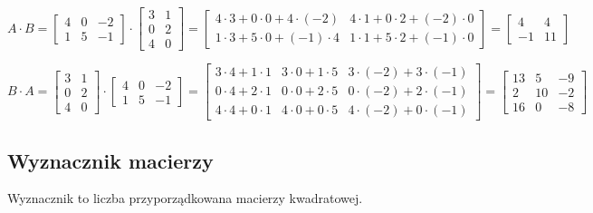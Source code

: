 \documentclass[../Matematyka.tex]{subfiles}
\begin{document}
    \begin{displaymath}
        A \cdot B = 
        \begin{bmatrix}
            4 & 0 & -2 \\
            1 & 5 & -1
        \end{bmatrix}\cdot
        \begin{bmatrix}
            3 & 1 \\
            0 & 2 \\
            4 & 0
        \end{bmatrix} =
        \begin{bmatrix}
            4\cdot3+0\cdot0+4\cdot(-2) & 4\cdot1+0\cdot2+(-2)\cdot0 \\
            1\cdot3+5\cdot0+(-1)\cdot4 & 1\cdot1+5\cdot2+(-1)\cdot0 
        \end{bmatrix} = 
        \begin{bmatrix}
            4 & 4 \\
            -1 & 11 
        \end{bmatrix} 
    \end{displaymath}

    \begin{displaymath}
        B \cdot A = 
        \begin{bmatrix}
            3 & 1 \\
            0 & 2 \\
            4 & 0
        \end{bmatrix}\cdot
        \begin{bmatrix}
            4 & 0 & -2 \\
            1 & 5 & -1
        \end{bmatrix} =
        \begin{bmatrix}
            3\cdot4+1\cdot1 & 3\cdot0+1\cdot5 & 3\cdot(-2)+3\cdot(-1) \\
            0\cdot4+2\cdot1 & 0\cdot0+2\cdot5 & 0\cdot(-2)+2\cdot(-1) \\
            4\cdot4+0\cdot1 & 4\cdot0+0\cdot5 & 4\cdot(-2)+0\cdot(-1) 
        \end{bmatrix} = 
        \begin{bmatrix}
            13 & 5 & -9 \\
            2 & 10 & -2 \\
            16 & 0 & -8 
        \end{bmatrix} 
    \end{displaymath}

    \subsection{Wyznacznik macierzy}
    Wyznacznik to liczba przyporządkowana macierzy kwadratowej.
\end{document}
